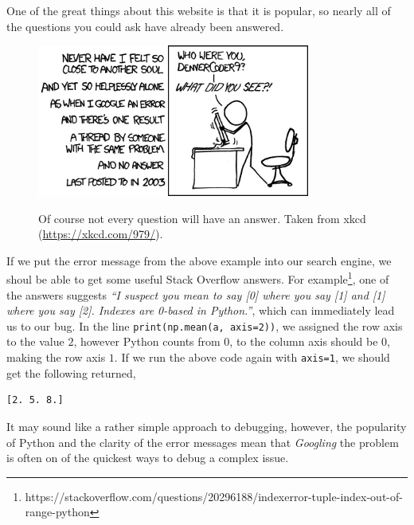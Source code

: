 \documentclass[a4paper]{article}
\begin{document}
One of the great things about this website is that it is popular, so nearly all of the questions you could ask have already been answered.
%
\begin{figure}[t]
\centering
\includegraphics[width=0.8\textwidth]{wisdom_of_the_ancients}
\label{fig:wisdow}
\caption{Of course not every question will have an answer. Taken from xkcd (\url{https://xkcd.com/979/}).}
\end{figure}
%

If we put the error message from the above example into our search engine, we shoul be able to get some useful Stack Overflow answers.
For example\footnote{https://stackoverflow.com/questions/20296188/indexerror-tuple-index-out-of-range-python}, one of the answers suggests \emph{``I suspect you mean to say [0] where you say [1] and [1] where you say [2]. Indexes are 0-based in Python.''}, which can immediately lead us to our bug.
In the line \texttt{print(np.mean(a, axis=2))}, we assigned the row axis to the value $2$, however Python counts from $0$, to the column axis should be $0$, making the row axis $1$.
If we run the above code again with \texttt{axis=1}, we should get the following returned,
\begin{lstlisting}
[2. 5. 8.]
\end{lstlisting}
It may sound like a rather simple approach to debugging, however, the popularity of Python and the clarity of the error messages mean that \emph{Googling} the problem is often on of the quickest ways to debug a complex issue.
\end{document}
